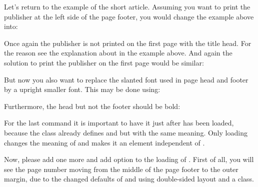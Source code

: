 \begin{Example}
  Let's return to the example of the short article. Assuming you want to print
  the publisher at the left side of the page footer, you would change the
  example above into:
  Once again the publisher is not printed on the first page with the title
  head. For the reason see the explanation about  in the example
  above. And again the solution to print the publisher on the first page would
  be similar:
\begin{lstcode}
\end{lstcode}
  But now you also want to replace the slanted font used in page head and
  footer by a upright smaller font. This may be done using:
\begin{lstcode}
\end{lstcode}
  Furthermore, the head but not the footer should be bold:
\begin{lstcode}
\end{lstcode}
  For the last command it is important to have it just after
   has been loaded, because
  the \KOMAScript{} class already defines  and
   but with the same meaning. Only loading
   changes the meaning of  and
  makes it an element independent of .

  Now, please add one more  and add option  to
  the loading of . First of all, you will see the page number
  moving from the middle of the page footer to the outer margin, due to the
  changed defaults of  and
   using double-sided layout and a \KOMAScript{}
  class.


\end{Example}
